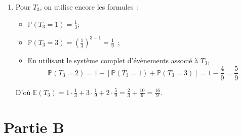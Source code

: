 \documentclass{article}
\newcommand{\prob}{\mathbb{P}}
\newcommand{\esp}{\mathbb{E}}
\begin{document}
\begin{enumerate}
    \item Pour $T_3$, on utilise encore les formules~:
    \begin{itemize}
      \item $\prob(T_3 = 1) = \frac{1}{3}$;
      \item $\prob(T_3 = 3) = \left(\frac{1}{3}\right)^{3 - 1} = \frac{1}{9}$~;
      \item En utilisant le système complet d'évènements associé à $T_3$,
      \[
        \prob(T_3 = 2) = 1 - [\prob(T_3 = 1) + \prob(T_3 = 3)] = 1 - \frac{4}{9} = \frac{5}{9}
      \]
    \end{itemize}
    D'où $\esp(T_3) = 1 \cdot \frac{1}{3} + 3 \cdot \frac{1}{9} + 2 \cdot \frac{5}{9} = \frac{2}{3} + \frac{10}{9} = \frac{16}{9}$.
  \end{enumerate}

  \section*{Partie B}
\end{document}
